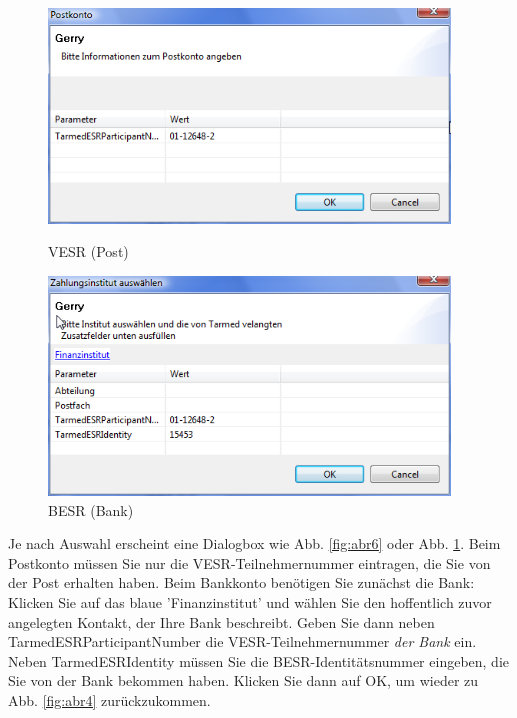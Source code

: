 \documentclass[a4paper]{scrartcl}
\begin{document}
\begin{figure}[htbp]
     \begin{minipage}{0.5\textwidth}
      \centering
       \includegraphics[width=0.95\textwidth]{abr6}
       \caption{VESR (Post)}
       	\label{fig:abr6}
     \end{minipage}\hfill
     \begin{minipage}{0.5\textwidth}
      \centering
       \includegraphics[width=0.95\textwidth]{abr7}
       \caption{BESR (Bank)}
       \label{fig:abr7}
     \end{minipage}
   \end{figure}

Je nach Auswahl erscheint eine Dialogbox wie Abb. \ref{fig:abr6} oder Abb. \ref{fig:abr7}. Beim Postkonto müssen Sie nur die VESR-Teilnehmernummer eintragen, die Sie von der Post erhalten haben. Beim Bankkonto benötigen Sie zunächst die Bank: Klicken Sie auf das blaue 'Finanzinstitut' und wählen Sie den hoffentlich zuvor angelegten Kontakt, der Ihre Bank beschreibt. Geben Sie dann neben TarmedESRParticipantNumber die VESR-Teilnehmernummer \textit{der Bank} ein. Neben TarmedESRIdentity müssen Sie die BESR-Identitätsnummer eingeben, die Sie von der Bank bekommen haben. Klicken Sie dann auf OK, um wieder zu Abb. \ref{fig:abr4} zurückzukommen.
\end{document}
